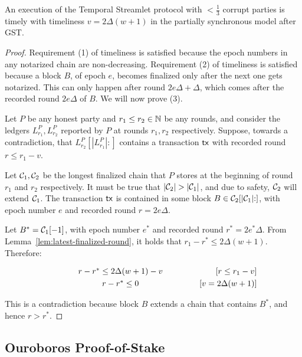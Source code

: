 \begin{theorem}
  An execution of the Temporal Streamlet protocol with $< \frac{1}{3}$ corrupt parties is timely
  with timeliness $v = 2\Delta(w + 1)$ in the partially synchronous model after GST.
\end{theorem}
\begin{proof}
  Requirement (1) of timeliness is satisfied because the epoch numbers in any notarized chain
  are non-decreasing.
  Requirement (2) of timeliness is satisfied because a block $B$, of epoch $e$, becomes finalized
  only after the next one gets notarized. This can only happen after round $2 e \Delta + \Delta$,
  which comes after the recorded round $2 e \Delta$ of $B$.
  We will now prove (3).

  Let $P$ be any honest party and $r_1 \leq r_2 \in \mathbb{N}$ be any rounds, and consider
  the ledgers $L^P_{r_1}, L^P_{r_2}$ reported by $P$ at rounds $r_1, r_2$ respectively.
  Suppose, towards a contradiction, that $L^P_{r_2}[|L^P_{r_1}|{:}]$ contains a transaction
  $\textsf{tx}$ with recorded round $r \leq r_1 - v$.

  Let $\mathcal{C}_1, \mathcal{C}_2$ be the longest finalized chain that $P$ stores at the beginning of round $r_1$
  and $r_2$ respectively.
  It must be true that $|\mathcal{C}_2| > |\mathcal{C}_1|$, and due to safety, $\mathcal{C}_2$ will extend $\mathcal{C}_1$.
  The transaction $\textsf{tx}$ is contained in some block $B \in \mathcal{C}_2[|\mathcal{C}_1|{:}]$,
  with epoch number $e$ and recorded round $r = 2e\Delta$.

  Let $B^* = \mathcal{C}_1[-1]$, with epoch number $e^*$ and recorded round $r^* = 2e^*\Delta$.
  From Lemma~\ref{lem:latest-finalized-round}, it holds that
  $r_1 - r^* \leq 2\Delta(w + 1)$. Therefore:

  \begin{align*}
    \makebox[0.5\textwidth][c]{$r - r^* \leq 2\Delta(w + 1) - v$}                && \text{[$r \leq r_1 - v$]} \\
    \makebox[0.5\textwidth][c]{$r - r^* \leq 0$}                                 && \text{[$v = 2\Delta(w + 1)$]}
  \end{align*}

  This is a contradiction because block $B$ extends a chain that contains $B^*$,
  and hence $r > r^*$.

  \Qed
\end{proof}




\subsection{Ouroboros Proof-of-Stake}

